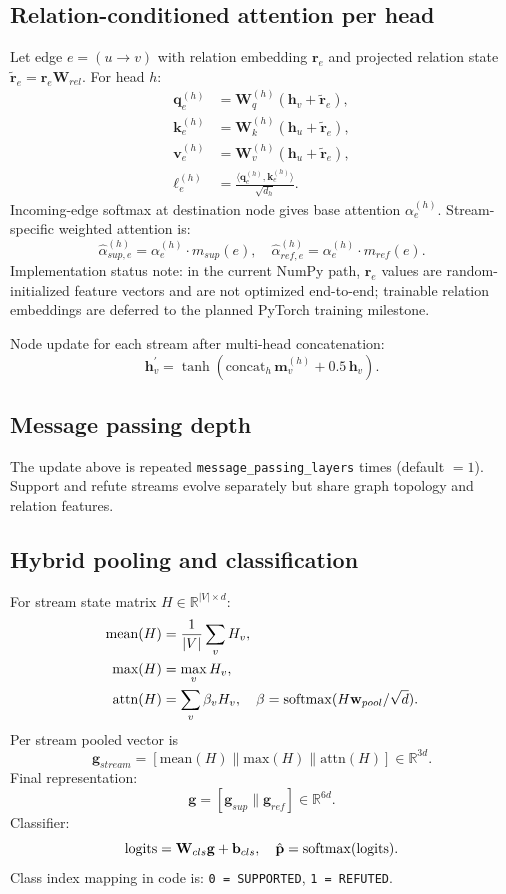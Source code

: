 \subsection{Relation-conditioned attention per head}
Let edge $e=(u\rightarrow v)$ with relation embedding $\mathbf{r}_e$ and projected relation state
$\tilde{\mathbf{r}}_e = \mathbf{r}_e \mathbf{W}_{rel}$.
For head $h$:
\begin{align}
\mathbf{q}^{(h)}_e &= \mathbf{W}^{(h)}_q (\mathbf{h}_v + \tilde{\mathbf{r}}_e), \\
\mathbf{k}^{(h)}_e &= \mathbf{W}^{(h)}_k (\mathbf{h}_u + \tilde{\mathbf{r}}_e), \\
\mathbf{v}^{(h)}_e &= \mathbf{W}^{(h)}_v (\mathbf{h}_u + \tilde{\mathbf{r}}_e), \\
\ell^{(h)}_e &= \frac{\langle \mathbf{q}^{(h)}_e, \mathbf{k}^{(h)}_e \rangle}{\sqrt{d_h}}.
\end{align}
Incoming-edge softmax at destination node gives base attention $\alpha^{(h)}_e$.
Stream-specific weighted attention is:
\[
\hat{\alpha}^{(h)}_{sup,e}=\alpha^{(h)}_e\cdot m_{sup}(e),
\quad
\hat{\alpha}^{(h)}_{ref,e}=\alpha^{(h)}_e\cdot m_{ref}(e).
\]
Implementation status note: in the current NumPy path, $\mathbf{r}_e$ values are random-initialized feature vectors and are not optimized end-to-end; trainable relation embeddings are deferred to the planned PyTorch training milestone.

Node update for each stream after multi-head concatenation:
\[
\mathbf{h}^{\prime}_v = \tanh(\text{concat}_h\,\mathbf{m}^{(h)}_v + 0.5\,\mathbf{h}_v).
\]

\subsection{Message passing depth}
The update above is repeated \texttt{message\_passing\_layers} times (default $=1$).
Support and refute streams evolve separately but share graph topology and relation features.

\subsection{Hybrid pooling and classification}
For stream state matrix $H\in\mathbb{R}^{|V|\times d}$:
\begin{align}
\text{mean}(H) &= \frac{1}{|V|}\sum_v H_v, \\
\text{max}(H) &= \max_v H_v, \\
\text{attn}(H) &= \sum_v \beta_v H_v,\quad \beta=\operatorname{softmax}(H\mathbf{w}_{pool}/\sqrt{d}).
\end{align}
Per stream pooled vector is
\[
\mathbf{g}_{stream} = [\text{mean}(H)\|\text{max}(H)\|\text{attn}(H)] \in \mathbb{R}^{3d}.
\]
Final representation:
\[
\mathbf{g}=[\mathbf{g}_{sup}\|\mathbf{g}_{ref}] \in \mathbb{R}^{6d}.
\]
Classifier:
\[
\text{logits}=\mathbf{W}_{cls}\mathbf{g}+\mathbf{b}_{cls},\quad
\hat{\mathbf{p}}=\operatorname{softmax}(\text{logits}).
\]
Class index mapping in code is:
\texttt{0 = SUPPORTED}, \texttt{1 = REFUTED}.

